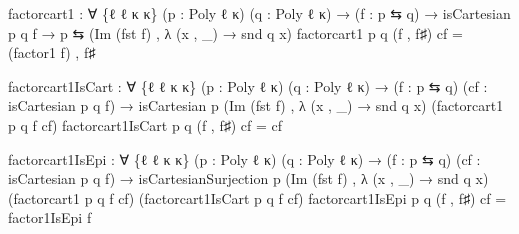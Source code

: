 \documentclass[
  11pt,
  oneside,
  article]{memoir}
\newenvironment{Shaded}{}{}
\newcommand{\NormalTok}[1]{#1}
\newcommand{\OtherTok}[1]{\textcolor[rgb]{0.00,0.44,0.13}{#1}}
\theoremstyle{definition}
\theoremstyle{plain}
\newcommand{\0}{\textsf{0}}
\newcommand{\1}{\tn{\textsf{1}}}
\begin{document}
\begin{Shaded}
\begin{Highlighting}[]
\NormalTok{factorcart1 }\OtherTok{:} \OtherTok{∀} \OtherTok{\{}\NormalTok{ℓ ℓ\textquotesingle{} κ κ\textquotesingle{}}\OtherTok{\}} \OtherTok{(}\NormalTok{p }\OtherTok{:}\NormalTok{ Poly ℓ κ}\OtherTok{)} \OtherTok{(}\NormalTok{q }\OtherTok{:}\NormalTok{ Poly ℓ\textquotesingle{} κ\textquotesingle{}}\OtherTok{)}
              \OtherTok{→} \OtherTok{(}\NormalTok{f }\OtherTok{:}\NormalTok{ p ⇆ q}\OtherTok{)} \OtherTok{→}\NormalTok{ isCartesian p q f}
              \OtherTok{→}\NormalTok{ p ⇆ }\OtherTok{(}\NormalTok{Im }\OtherTok{(}\NormalTok{fst f}\OtherTok{)}\NormalTok{ , }\OtherTok{λ} \OtherTok{(}\NormalTok{x , }\OtherTok{\_)} \OtherTok{→}\NormalTok{ snd q x}\OtherTok{)}
\NormalTok{factorcart1 p q }\OtherTok{(}\NormalTok{f , f♯}\OtherTok{)}\NormalTok{ cf }\OtherTok{=} 
    \OtherTok{(}\NormalTok{factor1 f}\OtherTok{)}\NormalTok{ , f♯}

\NormalTok{factorcart1IsCart }\OtherTok{:} \OtherTok{∀} \OtherTok{\{}\NormalTok{ℓ ℓ\textquotesingle{} κ κ\textquotesingle{}}\OtherTok{\}} \OtherTok{(}\NormalTok{p }\OtherTok{:}\NormalTok{ Poly ℓ κ}\OtherTok{)} \OtherTok{(}\NormalTok{q }\OtherTok{:}\NormalTok{ Poly ℓ\textquotesingle{} κ\textquotesingle{}}\OtherTok{)}
                    \OtherTok{→} \OtherTok{(}\NormalTok{f }\OtherTok{:}\NormalTok{ p ⇆ q}\OtherTok{)} \OtherTok{(}\NormalTok{cf }\OtherTok{:}\NormalTok{ isCartesian p q f}\OtherTok{)}
                    \OtherTok{→}\NormalTok{ isCartesian p }
                                  \OtherTok{(}\NormalTok{Im }\OtherTok{(}\NormalTok{fst f}\OtherTok{)}\NormalTok{ , }\OtherTok{λ} \OtherTok{(}\NormalTok{x , }\OtherTok{\_)} \OtherTok{→}\NormalTok{ snd q x}\OtherTok{)}
                                  \OtherTok{(}\NormalTok{factorcart1 p q f cf}\OtherTok{)}
\NormalTok{factorcart1IsCart p q }\OtherTok{(}\NormalTok{f , f♯}\OtherTok{)}\NormalTok{ cf }\OtherTok{=}\NormalTok{ cf}

\NormalTok{factorcart1IsEpi }\OtherTok{:} \OtherTok{∀} \OtherTok{\{}\NormalTok{ℓ ℓ\textquotesingle{} κ κ\textquotesingle{}}\OtherTok{\}} \OtherTok{(}\NormalTok{p }\OtherTok{:}\NormalTok{ Poly ℓ κ}\OtherTok{)} \OtherTok{(}\NormalTok{q }\OtherTok{:}\NormalTok{ Poly ℓ\textquotesingle{} κ\textquotesingle{}}\OtherTok{)}
                   \OtherTok{→} \OtherTok{(}\NormalTok{f }\OtherTok{:}\NormalTok{ p ⇆ q}\OtherTok{)} \OtherTok{(}\NormalTok{cf }\OtherTok{:}\NormalTok{ isCartesian p q f}\OtherTok{)}
                   \OtherTok{→}\NormalTok{ isCartesianSurjection p }
                        \OtherTok{(}\NormalTok{Im }\OtherTok{(}\NormalTok{fst f}\OtherTok{)}\NormalTok{ , }\OtherTok{λ} \OtherTok{(}\NormalTok{x , }\OtherTok{\_)} \OtherTok{→}\NormalTok{ snd q x}\OtherTok{)}
                        \OtherTok{(}\NormalTok{factorcart1 p q f cf}\OtherTok{)}
                        \OtherTok{(}\NormalTok{factorcart1IsCart p q f cf}\OtherTok{)}
\NormalTok{factorcart1IsEpi p q }\OtherTok{(}\NormalTok{f , f♯}\OtherTok{)}\NormalTok{ cf }\OtherTok{=}\NormalTok{ factor1IsEpi f}


\end{Highlighting}
\end{Shaded}
\end{document}
